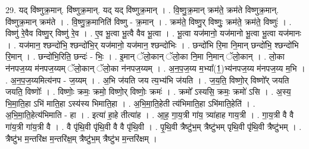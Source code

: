 \documentclass[17pt]{extarticle}
\begin{document}
29. यद् वि॑ष्णुक्र॒मान्. वि॑ष्णुक्र॒मान्. यद् यद् वि॑ष्णुक्र॒मान् । . वि॒ष्णु॒क्र॒मान् क्रम॑ते॒ क्रम॑ते विष्णुक्र॒मान्. वि॑ष्णुक्र॒मान् क्रम॑ते । . वि॒ष्णु॒क्र॒मानिति॑ विष्णु - क्र॒मान् । . क्रम॑ते॒ विष्णु॒र् विष्णुः॒ क्रम॑ते॒ क्रम॑ते॒ विष्णुः॑ । . विष्णु॑ रे॒वैव विष्णु॒र् विष्णु॑ रे॒व । . ए॒व भू॒त्वा भू॒त्वै वैव भू॒त्वा । . भू॒त्वा यज॑मानो॒ यज॑मानो भू॒त्वा भू॒त्वा यज॑मानः । . यज॑मान॒ श्छन्दो॑भि॒ श्छन्दो॑भि॒र् यज॑मानो॒ यज॑मान॒ श्छन्दो॑भिः । . छन्दो॑भि रि॒मा नि॒मान् छन्दो॑भि॒ श्छन्दो॑भि रि॒मान् । . छन्दो॑भि॒रिति॒ छन्दः॑ - भिः॒ । . इ॒मान् ॅलो॒कान् ॅलो॒का नि॒मा नि॒मान् ॅलो॒कान् । . लो॒का न॑नपज॒य्य म॑नपज॒य्यम् ॅलो॒कान् ॅलो॒का न॑नपज॒य्यम् । . अ॒न॒प॒ज॒य्य म॒भ्या᳚(1॒)भ्य॑नपज॒य्य म॑नपज॒य्य म॒भि । . अ॒न॒प॒ज॒य्यमित्य॑नप - ज॒य्यम् । . अ॒भि ज॑यति जय त्य॒भ्य॑भि ज॑यति । . ज॒य॒ति॒ विष्णो॒र् विष्णो᳚र् जयति जयति॒ विष्णोः᳚ । . विष्णोः॒ क्रमः॒ क्रमो॒ विष्णो॒र् विष्णोः॒ क्रमः॑ । . क्रमो᳚ ऽस्यसि॒ क्रमः॒ क्रमो॑ ऽसि । . अ॒स्य॒ भि॒मा॒ति॒हा ऽभि॑ माति॒हा ऽस्य॑स्य भिमाति॒हा । . अ॒भि॒मा॒ति॒हेती त्य॑भिमाति॒हा ऽभि॑माति॒हेति॑ । . अ॒भि॒मा॒ति॒हेत्य॑भिमाति - हा । . इत्या॑ हा॒हे तीत्या॑ह । . आ॒ह॒ गा॒य॒त्री गा॑य॒ त्र्या॑हाह गाय॒त्री । . गा॒य॒त्री वै वै गा॑य॒त्री गा॑य॒त्री वै । . वै पृ॑थि॒वी पृ॑थि॒वी वै वै पृ॑थि॒वी । . पृ॒थि॒वी त्रैष्टु॑भ॒म् त्रैष्टु॑भम् पृथि॒वी पृ॑थि॒वी त्रैष्टु॑भम् । . त्रैष्टु॑भ म॒न्तरि॑क्ष म॒न्तरि॑क्ष॒म् त्रैष्टु॑भ॒म् त्रैष्टु॑भ म॒न्तरि॑क्षम् । \newline
\end{document}

